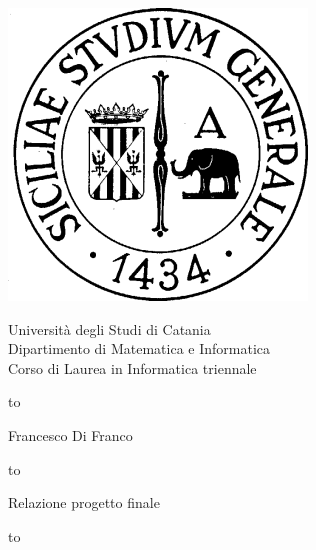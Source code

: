 \begin{titlepage}
\begin{center}


\noindent\begin{minipage}{0.2\textwidth}%
\includegraphics[scale=0.25, bb=0 0 200 200]{./img/logo_unict2.png}
\vspace{0.4truecm}
\end{minipage}%
\begin{minipage}{0.8\textwidth}
\begin{center}
\Large{	Università degli Studi di Catania \\
			Dipartimento di Matematica e Informatica \\
			Corso di Laurea in Informatica triennale }

\vspace{0.4truecm}
\end{center}
\end{minipage}
\hbox to \textwidth{\hrulefill}

\vspace{1.5truecm}
\Large {\sc Francesco Di Franco}
\vspace{1.0truecm}


\LARGE{}


\vspace{2.0truecm}
\begin{minipage}[t][3cm][b]{0,5\textwidth}
\hbox to \textwidth{\hrulefill}
\begin{center}
\hspace{4cm}
Relazione progetto finale
\end{center}

\hbox to \textwidth{\hrulefill}
\end{minipage}



\end{center}
\end{titlepage}
